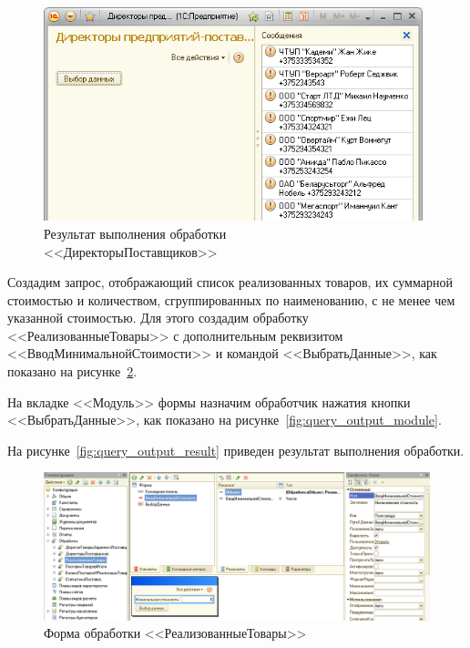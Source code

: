 \begin{figure}[h!]
  \centering
  \includegraphics[width=110mm]{pic/query_directors_result}
  \caption{Результат выполнения обработки \\ <<ДиректорыПоставщиков>>}
  \label{fig:query_directors_result}
\end{figure}

\pagebreak

Создадим запрос, отображающий список реализованных товаров,
их суммарной стоимостью и количеством, сгруппированных по
наименованию, с не менее чем указанной стоимостью.
Для этого создадим обработку <<РеализованныеТовары>>
с дополнительным реквизитом <<ВводМинимальнойСтоимости>> и
командой <<ВыбратьДанные>>,
как показано на рисунке~\ref{fig:query_output_form}.

На вкладке <<Модуль>> формы назначим обработчик нажатия кнопки
<<ВыбратьДанные>>, как показано на рисунке~\ref{fig:query_output_module}.

На рисунке~\ref{fig:query_output_result} приведен результат
выполнения обработки.

\begin{figure}[h!]
  \centering
  \includegraphics[width=150mm]{pic/query_output_form}
  \caption{Форма обработки <<РеализованныеТовары>>}
  \label{fig:query_output_form}
\end{figure}

